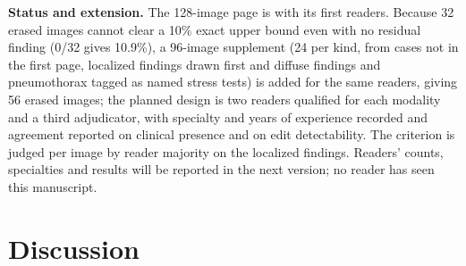 \documentclass[11pt]{article}
\begin{document}
\textbf{Status and extension.} The 128-image page is with its first readers. Because 32 erased images cannot clear a 10\% exact upper bound even with no residual finding (0/32 gives 10.9\%), a 96-image supplement (24 per kind, from cases not in the first page, localized findings drawn first and diffuse findings and pneumothorax tagged as named stress tests) is added for the same readers, giving 56 erased images; the planned design is two readers qualified for each modality and a third adjudicator, with specialty and years of experience recorded and agreement reported on clinical presence and on edit detectability. The criterion is judged per image by reader majority on the localized findings. Readers' counts, specialties and results will be reported in the next version; no reader has seen this manuscript.

\section{Discussion}
\end{document}
